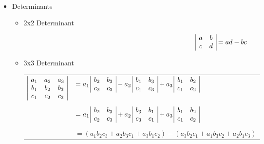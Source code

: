 \documentclass[12pt]{article}
\newcommand{\<}{\left<}
\renewcommand{\>}{\right>}
\begin{document}
    \begin{itemize}
    \item Determinants
      \begin{itemize}
      \item 2x2 Determinant
      
      \[
\begin{array}{|c c|}
a & b \\
c & d \\
\end{array}
      = ad - bc
      \]
      
      \item 3x3 Determinant

\begin{center}\begin{tabular}{rl}
  $
    \begin{array}{|c c c|}
    a_1 & a_2 & a_3 \\
    b_1 & b_2 & b_3 \\
    c_1 & c_2 & c_3 \\
    \end{array}
  $
  &
  $
      = a_1 \,
    \begin{array}{|c c|}
    b_2 & b_3 \\
    c_2 & c_3 \\
    \end{array}
      - a_2 \,
    \begin{array}{|c c|}
    b_1 & b_3 \\
    c_1 & c_3 \\
    \end{array}
      + a_3 \,
    \begin{array}{|c c|}
    b_1 & b_2 \\
    c_1 & c_2 \\
    \end{array}
  $
  \\ [1ex] \\ &
  $
     = a_1 \,
    \begin{array}{|c c|}
    b_2 & b_3 \\
    c_2 & c_3 \\
    \end{array}
      + a_2 \,
    \begin{array}{|c c|}
    b_3 & b_1 \\
    c_3 & c_1 \\
    \end{array}
      + a_3 \,
    \begin{array}{|c c|}
    b_1 & b_2 \\
    c_1 & c_2 \\
    \end{array}
  $
  \\ [1ex] \\ &
  $= (a_1b_2c_3 + a_2b_3c_1 + a_3b_1c_2) - (a_3b_2c_1 + a_1b_3c_2 + a_2b_1c_3)$
\end{tabular}\end{center}
      

\end{itemize}
\end{itemize}
\end{document}
